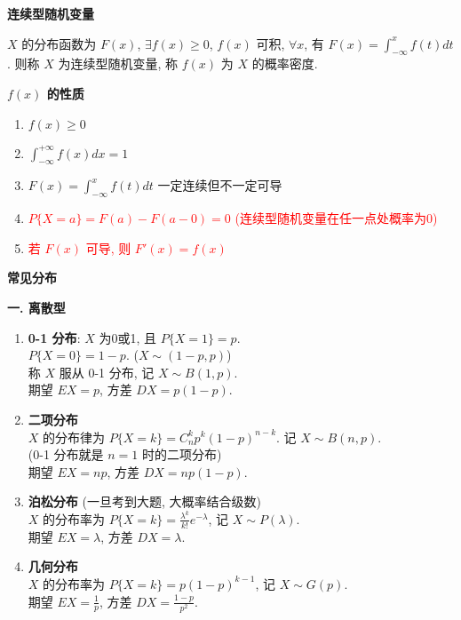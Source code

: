 \documentclass[padp]{ExBook}
\begin{document}
\textbf{连续型随机变量}
\vspace{1em}

$X$ 的分布函数为 $F(x)$, $\exists f(x) \ge 0$, $f(x)$ 可积,
$\forall x$, 有 $F(x) = \int_{-\infty}^{x} f(t)dt$.
则称 $X$ 为连续型随机变量, 称 $f(x)$ 为 $X$ 的概率密度.

\vspace{1em}
\textbf{$f(x)$ 的性质}
\begin{enumerate}[label=\arabic*.]
    \item $f(x) \ge 0$
    \item $\int_{-\infty}^{+\infty} f(x)dx = 1$
    \item $F(x) = \int_{-\infty}^{x} f(t)dt$ 一定连续但不一定可导
    \item \textcolor{red}{$P\{X=a\} = F(a) - F(a-0) = 0$ (连续型随机变量在任一点处概率为0)}
    \item \textcolor{red}{若 $F(x)$ 可导, 则 $F'(x)=f(x)$}
\end{enumerate}

\hrulefill
\vspace{1em}

\textbf{常见分布}
\vspace{1em}

\textbf{一. 离散型}
\begin{enumerate}[label=\arabic*.]
    \item \textbf{0-1 分布}: $X$ 为0或1, 且 $P\{X=1\}=p$. \\
    $P\{X=0\}=1-p$. ($X \sim (1-p, p)$) \\
    称 $X$ 服从 0-1 分布, 记 $X \sim B(1,p)$. \\
    期望 $EX=p$, 方差 $DX=p(1-p)$.

    \item \textbf{二项分布} \\
    $X$ 的分布律为 $P\{X=k\} = C_n^k p^k (1-p)^{n-k}$.
    记 $X \sim B(n,p)$. \\
    (0-1 分布就是 $n=1$ 时的二项分布) \\
    期望 $EX=np$, 方差 $DX=np(1-p)$.

    \item \textbf{泊松分布} (一旦考到大题, 大概率结合级数) \\
    $X$ 的分布率为 $P\{X=k\} = \frac{\lambda^k}{k!}e^{-\lambda}$, 记 $X \sim P(\lambda)$. \\
    期望 $EX=\lambda$, 方差 $DX=\lambda$.

    \item \textbf{几何分布} \\
    $X$ 的分布率为 $P\{X=k\} = p(1-p)^{k-1}$, 记 $X \sim G(p)$. \\
    期望 $EX=\frac{1}{p}$, 方差 $DX=\frac{1-p}{p^2}$.
\end{enumerate}
\end{document}
